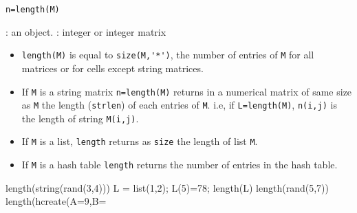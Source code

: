 
\begin{mandesc}
\end{mandesc}
\begin{calling_sequence}
\begin{verbatim}
n=length(M)   
\end{verbatim}
\end{calling_sequence}

\begin{parameters}
  \begin{varlist}
     : an object.
     : integer or integer matrix
  \end{varlist}
\end{parameters}

\begin{mandescription}
\begin{itemize}
  \item \verb!length(M)! is equal to \verb!size(M,'*')!, the number of entries of \verb!M! for all matrices 
    or for cells except string matrices.
  \item If \verb+M+ is a string matrix \verb+n=length(M)+ returns in a  numerical matrix of same size 
    as \verb+M+ the length (\verb+strlen+) of each entries of \verb+M+. i.e, if \verb+L=length(M)+, 
    \verb+n(i,j)+ is the length of string \verb+M(i,j)+.
  \item If \verb+M+ is a list, \verb+length+ returns as \verb+size+ the length of list \verb+M+.
  \item If \verb+M+ is a hash table \verb+length+ returns the number of entries in the hash table.
\end{itemize}
\end{mandescription}

\begin{examples}
  \begin{program}
    length(string(rand(3,4)))
    L = list(1,2); L(5)=78; length(L)
    length(rand(5,7))
    length(hcreate(A=9,B=%
  \end{program}
\end{examples}

\begin{manseealso}
\end{manseealso}


